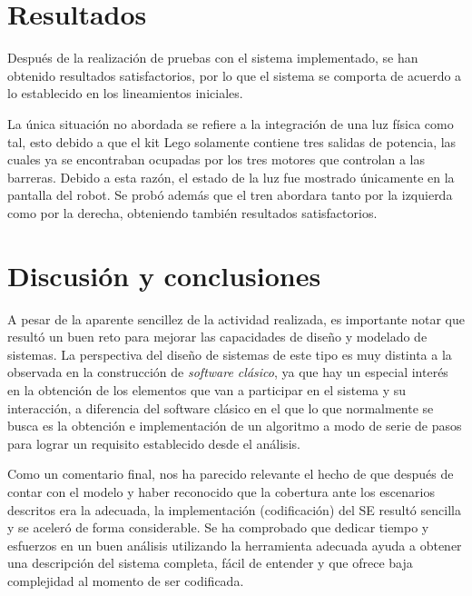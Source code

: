 \documentclass[journal]{IEEEtran}
\begin{document}
\section{Resultados} 
\label{sec:resultados}
Después de la realización de pruebas con el sistema implementado, se han obtenido resultados satisfactorios, por lo que el sistema se comporta de acuerdo a lo establecido en los lineamientos iniciales.

La única situación no abordada se refiere a la integración de una luz física como tal, esto debido a que el kit Lego solamente contiene tres salidas de potencia, las cuales ya se encontraban ocupadas por los tres motores que controlan a las barreras.
Debido a esta razón, el estado de la luz fue mostrado únicamente en la pantalla del robot.
Se probó además que el tren abordara tanto por la izquierda como por la derecha, obteniendo también resultados satisfactorios.


\section{Discusión y conclusiones}
\label{sec:discusion}
A pesar de la aparente sencillez de la actividad realizada, es importante notar que resultó un buen reto para mejorar las capacidades de diseño y modelado de sistemas.
La perspectiva del diseño de sistemas de este tipo es muy distinta a la observada en la construcción de \emph{software clásico}, ya que hay un especial interés en la obtención de los elementos que van a participar en el sistema y su interacción, a diferencia del software clásico en el que lo que normalmente se busca es la obtención e implementación de un algoritmo a modo de serie de pasos para lograr un requisito establecido desde el análisis.

Como un comentario final, nos ha parecido relevante el hecho de que después de contar con el modelo y haber reconocido que la cobertura ante los escenarios descritos era la adecuada, la implementación (codificación) del SE resultó sencilla y se aceleró de forma considerable.
Se ha comprobado que dedicar tiempo y esfuerzos en un buen análisis utilizando la herramienta adecuada ayuda a obtener una descripción del sistema completa, fácil de entender y que ofrece baja complejidad al momento de ser codificada.



\end{document}
